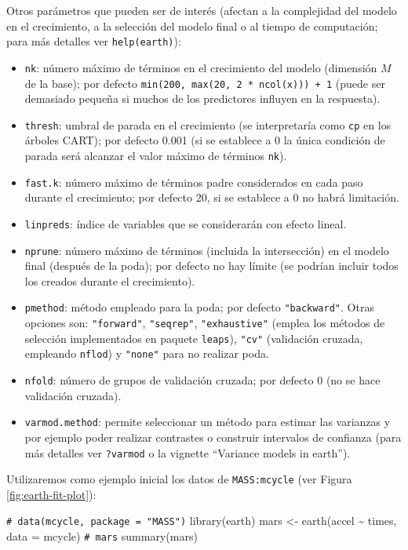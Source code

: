 \documentclass[
]{book}
\newenvironment{Shaded}{\begin{snugshade}}{\end{snugshade}}
\newcommand{\AttributeTok}[1]{\textcolor[rgb]{0.77,0.63,0.00}{#1}}
\newcommand{\CommentTok}[1]{\textcolor[rgb]{0.56,0.35,0.01}{\textit{#1}}}
\newcommand{\FunctionTok}[1]{\textcolor[rgb]{0.00,0.00,0.00}{#1}}
\newcommand{\NormalTok}[1]{#1}
\newcommand{\OtherTok}[1]{\textcolor[rgb]{0.56,0.35,0.01}{#1}}
\newcommand{\SpecialCharTok}[1]{\textcolor[rgb]{0.00,0.00,0.00}{#1}}
\theoremstyle{break}
\theoremstyle{nonumberplain}
\renewcommand{\CommentTok}[1]{\textcolor[rgb]{0.41,0.41,0.41}{\texttt{#1}}}
\begin{document}
Otros parámetros que pueden ser de interés (afectan a la complejidad del modelo en el crecimiento, a la selección del modelo final o al tiempo de computación; para más detalles ver \texttt{help(earth)}):

\begin{itemize}
\item
  \texttt{nk}: número máximo de términos en el crecimiento del modelo (dimensión \(M\) de la base); por defecto \texttt{min(200,\ max(20,\ 2\ *\ ncol(x)))\ +\ 1} (puede ser demasiado pequeña si muchos de los predictores influyen en la respuesta).
\item
  \texttt{thresh}: umbral de parada en el crecimiento (se interpretaría como \texttt{cp} en los árboles CART); por defecto 0.001 (si se establece a 0 la única condición de parada será alcanzar el valor máximo de términos \texttt{nk}).
\item
  \texttt{fast.k}: número máximo de términos padre considerados en cada paso durante el crecimiento; por defecto 20, si se establece a 0 no habrá limitación.
\item
  \texttt{linpreds}: índice de variables que se considerarán con efecto lineal.
\item
  \texttt{nprune}: número máximo de términos (incluida la intersección) en el modelo final (después de la poda); por defecto no hay límite (se podrían incluir todos los creados durante el crecimiento).
\item
  \texttt{pmethod}: método empleado para la poda; por defecto \texttt{"backward"}. Otras opciones son: \texttt{"forward"}, \texttt{"seqrep"}, \texttt{"exhaustive"} (emplea los métodos de selección implementados en paquete \texttt{leaps}), \texttt{"cv"} (validación cruzada, empleando \texttt{nflod}) y \texttt{"none"} para no realizar poda.
\item
  \texttt{nfold}: número de grupos de validación cruzada; por defecto 0 (no se hace validación cruzada).
\item
  \texttt{varmod.method}: permite seleccionar un método para estimar las varianzas y por ejemplo poder realizar contrastes o construir intervalos de confianza (para más detalles ver \texttt{?varmod} o la vignette ``Variance models in earth'').
\end{itemize}

Utilizaremos como ejemplo inicial los datos de \texttt{MASS:mcycle} (ver Figura \ref{fig:earth-fit-plot}):



\begin{Shaded}
\begin{Highlighting}[]
\CommentTok{\# data(mcycle, package = "MASS")}
\FunctionTok{library}\NormalTok{(earth)}
\NormalTok{mars }\OtherTok{\textless{}{-}} \FunctionTok{earth}\NormalTok{(accel }\SpecialCharTok{\textasciitilde{}}\NormalTok{ times, }\AttributeTok{data =}\NormalTok{ mcycle)}
\CommentTok{\# mars}
\FunctionTok{summary}\NormalTok{(mars)}
\end{Highlighting}
\end{Shaded}
\end{document}
